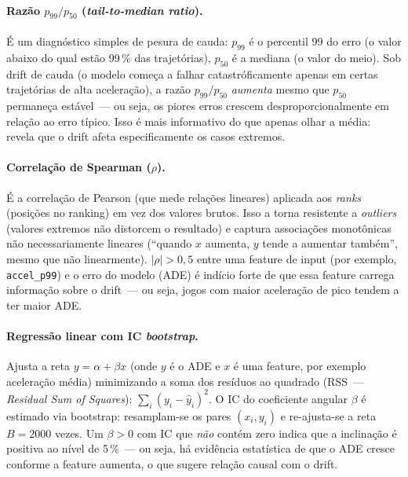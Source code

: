 \documentclass[11pt,a4paper]{article}
\begin{document}
\paragraph{Raz\~ao $p_{99}/p_{50}$ (\emph{tail-to-median ratio}).}
\'E um diagn\'ostico simples de pesura de cauda: $p_{99}$ \'e o percentil 99 do erro (o valor abaixo do qual est\~ao 99\,\% das trajet\'orias), $p_{50}$ \'e a mediana (o valor do meio). Sob drift de cauda (o modelo come\c{c}a a falhar catastr\'oficamente apenas em certas trajet\'orias de alta acelera\c{c}\~ao), a raz\~ao $p_{99}/p_{50}$ \emph{aumenta} mesmo que $p_{50}$ permane\c{c}a est\'avel~--- ou seja, os piores erros crescem desproporcionalmente em rela\c{c}\~ao ao erro t\'ipico. Isso \'e mais informativo do que apenas olhar a m\'edia: revela que o drift afeta especificamente os casos extremos.

\paragraph{Correla\c{c}\~ao de Spearman ($\rho$).}
\'E a correla\c{c}\~ao de Pearson (que mede rela\c{c}\~oes lineares) aplicada aos \emph{ranks} (posi\c{c}\~oes no ranking) em vez dos valores brutos. Isso a torna resistente a \emph{outliers} (valores extremos n\~ao distorcem o resultado) e captura associa\c{c}\~oes monot\^onicas n\~ao necessariamente lineares (``quando $x$ aumenta, $y$ tende a aumentar tamb\'em'', mesmo que n\~ao linearmente). $|\rho|\!>\!0{,}5$ entre uma feature de input (por exemplo, \texttt{accel\_p99}) e o erro do modelo (ADE) \'e ind\'icio forte de que essa feature carrega informa\c{c}\~ao sobre o drift~--- ou seja, jogos com maior acelera\c{c}\~ao de pico tendem a ter maior ADE.

\paragraph{Regress\~ao linear com IC \emph{bootstrap}.}
Ajusta a reta $y = \alpha + \beta x$ (onde $y$ \'e o ADE e $x$ \'e uma feature, por exemplo aceler\-a\-\c{c}\~ao m\'edia) minimizando a soma dos res\'iduos ao quadrado (RSS~--- \emph{Residual Sum of Squares}): $\sum_i (y_i - \hat{y}_i)^2$. O IC do coeficiente angular $\beta$ \'e estimado via bootstrap: resamplam-se os pares $(x_i, y_i)$ e re-ajusta-se a reta $B=2000$ vezes. Um $\beta\!>\!0$ com IC que \emph{n\~ao} cont\'em zero indica que a inclina\c{c}\~ao \'e positiva ao n\'ivel de 5\,\%~--- ou seja, h\'a evid\^encia estat\'istica de que o ADE cresce conforme a feature aumenta, o que sugere rela\c{c}\~ao causal com o drift.
\end{document}
